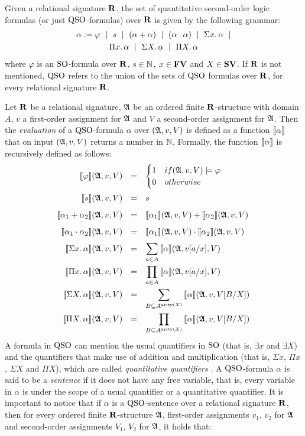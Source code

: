 
Given a relational signature $\mathbf{R}$, the set of quantitative second-order logic formulas (or just ${\rm QSO}$-formulas) over $\mathbf{R}$ is given by the following grammar:
\begin{multline}
\label{eq-def-qso}
\alpha := \varphi \ \mid \ s \ \mid \ (\alpha \add \alpha) \ \mid\ (\alpha \mult \alpha) \ \mid \ \sa{x} \alpha \ \mid \\ \pa{x} \alpha \ \mid \ \sa{X} \alpha \ \mid \ \pa{X} \alpha 
\end{multline}
where $\varphi$ is an ${\rm SO}$-formula over $\mathbf{R}$, $s \in \mathbb{N}$, $x \in \mathbf{FV}$ and $X \in \mathbf{SV}$. If $\mathbf{R}$ is not mentioned, ${\rm QSO}$ refers to the union of the sets of ${\rm QSO}$ formulas over $\mathbf{R}$, for every relational signature $\mathbf{R}$.

Let $\mathbf{R}$ be a relational signature, $\mathfrak{A}$ be an ordered finite $\mathbf{R}$-structure with domain $A$, $v$ a first-order assignment for $\mathfrak{A}$ and $V$ a second-order assignment for $\mathfrak{A}$. Then the \emph{evaluation} of a ${\rm QSO}$-formula $\alpha$ over $(\mathfrak{A}, v, V)$ is defined as a function ${\llbracket{}{\alpha}\rrbracket}$ that on input $(\mathfrak{A}, v, V)$ returns a number in $\mathbb{N}$. Formally, the function ${\llbracket{}{\alpha}\rrbracket}$ is recursively defined as follows:
$$
\renewcommand{\arraystretch}{1.7}
\begin{array}{rcl} 
\sem{\varphi}(\A, v, V) & = & 
\begin{cases}
1 & \mbox{if } (\A, v, V) \models \varphi \\
0 & \mbox{otherwise}
\end{cases}\\
\sem{s}(\A, v, V) & = & s \\
\sem{\alpha_1 \add \alpha_2}(\A, v, V) & = & \sem{\alpha_1}(\A, v, V) + \sem{\alpha_2}(\A, v, V)\\
\sem{\alpha_1 \mult \alpha_2}(\A, v, V) & = & \sem{\alpha_1}(\A, v, V) \cdot \sem{\alpha_2}(\A, v, V)\\ 
\sem{\sa{x} \alpha}(\A, v, V) & = & \displaystyle \sum_{a \in A} \sem{\alpha}(\A,v[a/x],V)\\
\sem{\pa{x} \alpha}(\A, v, V) & = & \displaystyle \prod_{a \in A} \sem{\alpha}(\A,v[a/x],V)\\
\sem{\sa{X} \alpha}(\A, v, V) & = & \displaystyle \sum_{B \subseteq A^{\arity(X)}} \sem{\alpha}(\A, v, V[B/X])\\
\sem{\pa{X} \alpha}(\A, v, V) & = & \displaystyle \prod_{B \subseteq A^{\arity(X)}} \sem{\alpha}(\A, v, V[B/X])
\end{array}
$$
A formula in ${\rm QSO}$ can mention the usual quantifiers in ${\rm SO}$ (that is, $\exists x$ and $\exists X$) and the quantifiers that make use of addition and multiplication (that is, $\Sigma x$, $\Pi x$, $\Sigma X$ and $\Pi X$), which are called {\em quantitative quantifiers} . A ${\rm QSO}$-formula $\alpha$ is said to be a \emph{sentence} if it does not have any free variable, that is, every variable in $\alpha$ is under the scope of a usual quantifier or a quantitative quantifier. It is important to notice that if $\alpha$ is a ${\rm QSO}$-sentence over a relational signature $\mathbf{R}$, then for every ordered finite $\mathbf{R}$-structure $\mathfrak{A}$, first-order assignments $v_1$, $v_2$ for $\mathfrak{A}$ and second-order assignments $V_1$, $V_2$ for $\mathfrak{A}$, it holds that:
